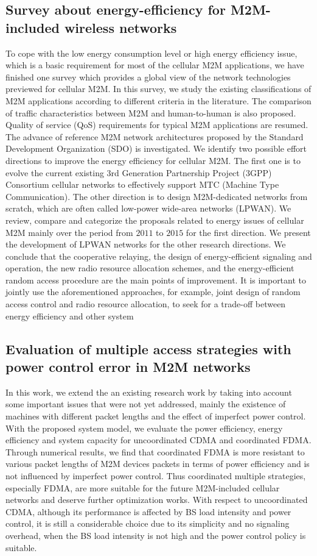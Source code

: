 \subsection{Survey about energy-efficiency for M2M-included wireless networks}
To cope with the low energy consumption level or high energy efficiency issue, which is a basic requirement for most of the cellular M2M applications, we have finished one survey which provides a global view of the network technologies previewed for cellular M2M. In this survey, we study the existing classifications of M2M applications according to different criteria in the literature. The comparison of traffic characteristics between M2M and human-to-human is also proposed. Quality of service (QoS) requirements for typical M2M applications are resumed. The advance of reference M2M network architectures proposed by the Standard Development Organization (SDO) is investigated. We identify two possible effort directions to improve the energy efficiency for cellular M2M. The first one is to evolve the current existing $3$rd Generation Partnership Project (3GPP) Consortium cellular networks to effectively support MTC (Machine Type Communication). The other direction is to design M2M-dedicated networks from scratch, which are often called low-power wide-area networks (LPWAN). We review, compare and categorize the proposals related to energy issues of cellular M2M mainly over the period from $2011$ to $2015$ for the first direction. We present the development of LPWAN networks for the other research directions. We conclude that the cooperative relaying, the design of energy-efficient signaling and operation, the new radio resource allocation schemes, and the energy-efficient random access procedure are the main points of improvement. It is important to jointly use the aforementioned approaches, for example, joint design of random access control and radio resource allocation, to seek for a trade-off between energy efficiency and other system

\subsection{Evaluation of multiple access strategies with power control error in M2M networks}
In this work, we extend the an existing research work by taking into account some important issues that were not yet addressed, mainly the existence of machines with different packet lengths and the effect of imperfect power control. With the proposed system model, we evaluate the power efficiency, energy efficiency and system capacity for uncoordinated CDMA and coordinated FDMA. Through numerical results, we find that coordinated FDMA is more resistant to various packet lengths of M2M devices packets in terms of power efficiency and is not influenced by imperfect power control. Thus coordinated multiple strategies, especially FDMA, are more suitable for the future M2M-included cellular networks and deserve further optimization works. With respect to uncoordinated CDMA, although its performance is affected by BS load intensity and power control, it is still a considerable choice due to its simplicity and no signaling overhead, when the BS load intensity is not high and the power control policy is suitable. 

